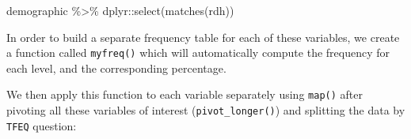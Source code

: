 \documentclass[
]{book}
\newenvironment{Shaded}{\begin{snugshade}}{\end{snugshade}}
\newcommand{\AttributeTok}[1]{\textcolor[rgb]{0.77,0.63,0.00}{#1}}
\newcommand{\ControlFlowTok}[1]{\textcolor[rgb]{0.13,0.29,0.53}{\textbf{#1}}}
\newcommand{\FunctionTok}[1]{\textcolor[rgb]{0.00,0.00,0.00}{#1}}
\newcommand{\NormalTok}[1]{#1}
\newcommand{\OtherTok}[1]{\textcolor[rgb]{0.56,0.35,0.01}{#1}}
\newcommand{\SpecialCharTok}[1]{\textcolor[rgb]{0.00,0.00,0.00}{#1}}
\begin{document}
\begin{Shaded}
\begin{Highlighting}[]
\NormalTok{demographic }\SpecialCharTok{\%\textgreater{}\%} 
\NormalTok{  dplyr}\SpecialCharTok{::}\FunctionTok{select}\NormalTok{(}\FunctionTok{matches}\NormalTok{(rdh))}
\end{Highlighting}
\end{Shaded}

In order to build a separate frequency table for each of these variables, we create a function called \texttt{myfreq()} which will automatically compute the frequency for each level, and the corresponding percentage.

\begin{Shaded}
\end{Shaded}

We then apply this function to each variable separately using \texttt{map()} after pivoting all these variables of interest (\texttt{pivot\_longer()}) and splitting the data by \texttt{TFEQ} question:
\end{document}
